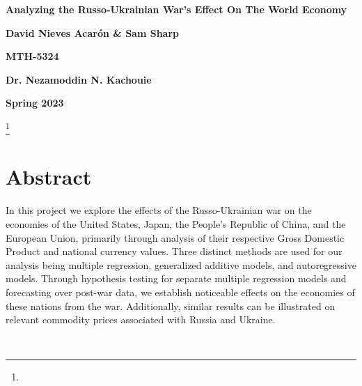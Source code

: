 \documentclass[11pt,regno]{amsart}
\theoremstyle{plain}
\numberwithin{equation}{section}
\begin{document}
\setcounter{page}{1}

\title{}
\author{}
\thispagestyle{plain}
\begin{center}
    \Large
    \textbf{Analyzing the Russo-Ukrainian War's Effect On The World Economy}
        
    \vspace{0.4cm}
    \large
    \textbf{David Nieves Acarón \& Sam Sharp}
        
    \vspace{0.4cm}
    \textbf{MTH-5324}
    
    \vspace{0.4cm}
    \textbf{Dr. Nezamoddin N. Kachouie}

    \vspace{0.4cm}
    \textbf{Spring 2023}
\end{center}
\thanks{}








\maketitle %
\doublespacing 


\section{ Abstract }

In this project we explore the effects of the Russo-Ukrainian war on the economies of the United States, Japan, the People's Republic of China, and the European Union, primarily through analysis of their respective Gross Domestic Product and national currency values. Three distinct methods are used for our analysis being multiple regression, generalized additive models, and autoregressive models. Through hypothesis testing for separate multiple regression models and forecasting over post-war data, we establish noticeable effects on the economies of these nations from the war. Additionally, similar results can be illustrated on relevant commodity prices associated with Russia and Ukraine.


\ 
\end{document}
